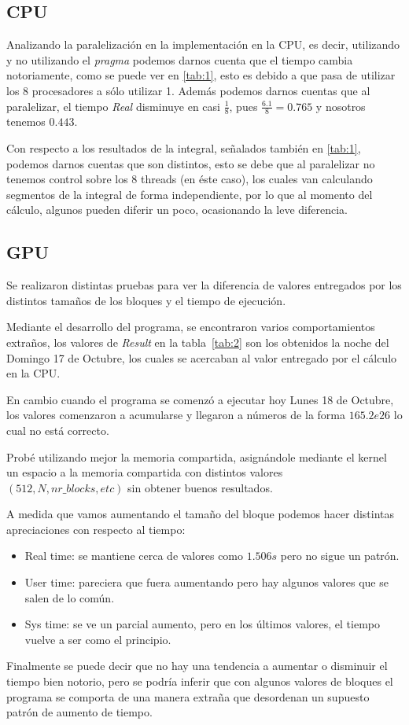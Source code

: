 \subsection{CPU}
	Analizando la paralelización en la implementación en la CPU,
	es decir, utilizando y no utilizando el \emph{pragma}
	podemos darnos cuenta que el tiempo cambia notoriamente,
	como se puede ver en \ref{tab:1}, esto es debido a que pasa
	de utilizar los 8 procesadores a sólo utilizar 1.
	Además podemos darnos cuentas que al paralelizar,
	el tiempo \emph{Real} disminuye en casi $\frac{1}{8}$,
	pues $\frac{6.1}{8} = 0.765$ y nosotros tenemos $0.443$.

	Con respecto a los resultados de la integral, señalados también
	en \ref{tab:1}, podemos darnos cuentas que son distintos,
	esto se debe que al paralelizar no tenemos control sobre los
	8 threads (en éste caso), los cuales van calculando segmentos
	de la integral de forma independiente, por lo que al momento del cálculo,
	algunos pueden diferir un poco, ocasionando la leve diferencia.


\subsection{GPU}

Se realizaron distintas pruebas para ver la diferencia de valores entregados
por los distintos tamaños de los bloques y el tiempo de ejecución.

Mediante el desarrollo del programa, se encontraron varios comportamientos extraños,
los valores de \emph{Result} en la tabla~\ref{tab:2} son los obtenidos la noche del Domingo 17 de Octubre,
los cuales se acercaban al valor entregado por el cálculo en la CPU.

En cambio cuando el programa se comenzó a ejecutar hoy Lunes 18 de Octubre,
los valores comenzaron a acumularse y llegaron a números de la forma $165.2e26$
lo cual no está correcto.

Probé utilizando mejor la memoria compartida, asignándole mediante el kernel
un espacio a la memoria compartida con distintos valores $(512, N, nr\_blocks, etc)$
sin obtener buenos resultados.

A medida que vamos aumentando el tamaño del bloque podemos hacer distintas apreciaciones
con respecto al tiempo:
\begin{itemize}
	\item Real time: se mantiene cerca de valores como $1.506s$ pero no sigue un patrón.
	\item User time: pareciera que fuera aumentando pero hay algunos valores que se salen de lo común.
	\item Sys  time: se ve un parcial aumento, pero en los últimos valores, el tiempo vuelve a ser como el principio.
\end{itemize}

Finalmente se puede decir que no hay una tendencia a aumentar o disminuir el tiempo bien notorio,
pero se podría inferir que con algunos valores de bloques el programa se comporta de una manera extraña
que desordenan un supuesto patrón de aumento de tiempo.

